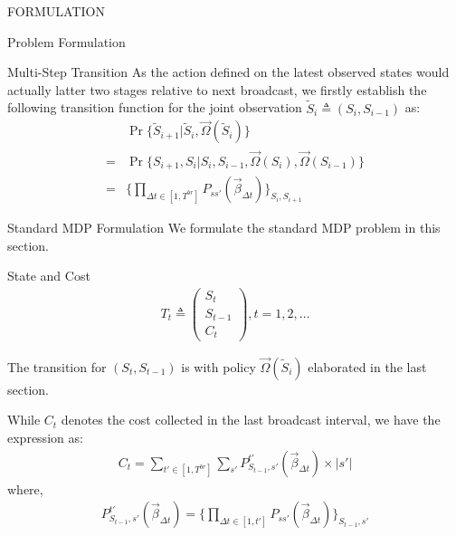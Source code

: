 \documentclass[10pt, conference, letterpaper]{IEEEtran}
\begin{document}
\begin{section}{FORMULATION}
\begin{subsection}{Problem Formulation}
\begin{subsubsection}{Multi-Step Transition}
                As the action defined on the latest observed states would actually latter two stages relative to next broadcast, we firstly establish the following transition function for the joint observation $\tilde{S}_i \triangleq (S_{i}, S_{i-1})$ as:
                \begin{align}
                    & \Pr\{\tilde{S}_{i+1} | \tilde{S}_{i}, \vec{\Omega}(\tilde{S}_i)\}
                    \nonumber\\
                    = & \Pr\{S_{i+1}, S_{i} | S_{i},S_{i-1}, \vec{\Omega}(S_{i}), \vec{\Omega}(S_{i-1})\}
                    \nonumber\\
                    = & \{
                            \prod_{\Delta{t} \in [1,T^{br}]} P_{ss'}(\vec{\beta}_{\Delta{t}})
                        \}_{S_{i}, S_{i+1}}
                \end{align}
            \end{subsubsection}

        \end{subsection}

        \begin{subsection}{Standard MDP Formulation}
            We formulate the standard MDP problem in this section.

            \begin{subsubsection}{State and Cost}
                \begin{align}
                    T_t \triangleq \begin{pmatrix}
                        S_t \\ S_{t-1} \\ C_t
                    \end{pmatrix}, t=1,2,\dots
                \end{align}

                The transition for $(S_{t}, S_{t-1})$ is with policy $\vec{\Omega}(\tilde{S}_i)$ elaborated in the last section.
                
                While $C_t$ denotes the cost collected in the last broadcast interval, we have the expression as:
                \begin{align}
                    C_t = \sum_{t'\in[1,T^{br}]} \sum_{s'} P_{S_{t-1},s'}^{t'}(\vec{\beta}_{\Delta{t}}) \times |s'|
                \end{align}
                where,
                \begin{align}
                    P_{S_{t-1},s'}^{t'}(\vec{\beta}_{\Delta{t}})
                    = \{
                        \prod_{\Delta{t} \in [1,t']} P_{ss'}(\vec{\beta}_{\Delta{t}})
                    \}_{S_{t-1}, s'}
                \end{align}
            \end{subsubsection}


\end{subsection}
\end{section}
\end{document}
